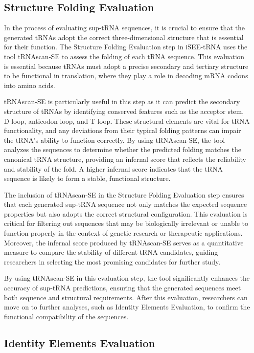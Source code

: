 \subsection{Structure Folding Evaluation}

In the process of evaluating sup-tRNA sequences, it is crucial to ensure that the generated tRNAs adopt the correct three-dimensional structure that is essential for their function. The Structure Folding Evaluation step in iSEE-tRNA uses the tool tRNAscan-SE to assess the folding of each tRNA sequence. This evaluation is essential because tRNAs must adopt a precise secondary and tertiary structure to be functional in translation, where they play a role in decoding mRNA codons into amino acids.

tRNAscan-SE is particularly useful in this step as it can predict the secondary structure of tRNAs by identifying conserved features such as the acceptor stem, D-loop, anticodon loop, and T-loop. These structural elements are vital for tRNA functionality, and any deviations from their typical folding patterns can impair the tRNA's ability to function correctly. By using tRNAscan-SE, the tool analyzes the sequences to determine whether the predicted folding matches the canonical tRNA structure, providing an infernal score that reflects the reliability and stability of the fold. A higher infernal score indicates that the tRNA sequence is likely to form a stable, functional structure.

The inclusion of tRNAscan-SE in the Structure Folding Evaluation step ensures that each generated sup-tRNA sequence not only matches the expected sequence properties but also adopts the correct structural configuration. This evaluation is critical for filtering out sequences that may be biologically irrelevant or unable to function properly in the context of genetic research or therapeutic applications. Moreover, the infernal score produced by tRNAscan-SE serves as a quantitative measure to compare the stability of different tRNA candidates, guiding researchers in selecting the most promising candidates for further study.

By using tRNAscan-SE in this evaluation step, the tool significantly enhances the accuracy of sup-tRNA predictions, ensuring that the generated sequences meet both sequence and structural requirements. After this evaluation, researchers can move on to further analyses, such as Identity Elements Evaluation, to confirm the functional compatibility of the sequences.


\subsection{Identity Elements Evaluation}

